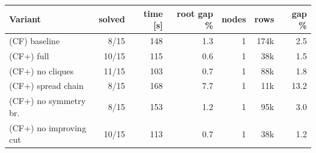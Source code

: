 \begin{tabular}{lrrrrrr}
\toprule
Variant & solved & time [s] & root gap \% & nodes & rows & gap \% \\
\midrule
(CF) baseline & 8/15 & 148 & 1.3 & 1 & 174k & 2.5 \\
(CF+) full & 10/15 & 115 & 0.6 & 1 & 38k & 1.5 \\
(CF+) no cliques & 11/15 & 103 & 0.7 & 1 & 88k & 1.8 \\
(CF+) spread chain & 8/15 & 168 & 7.7 & 1 & 11k & 13.2 \\
(CF+) no symmetry br. & 8/15 & 153 & 1.2 & 1 & 95k & 3.0 \\
(CF+) no improving cut & 10/15 & 113 & 0.7 & 1 & 38k & 1.2 \\
\bottomrule
\end{tabular}
